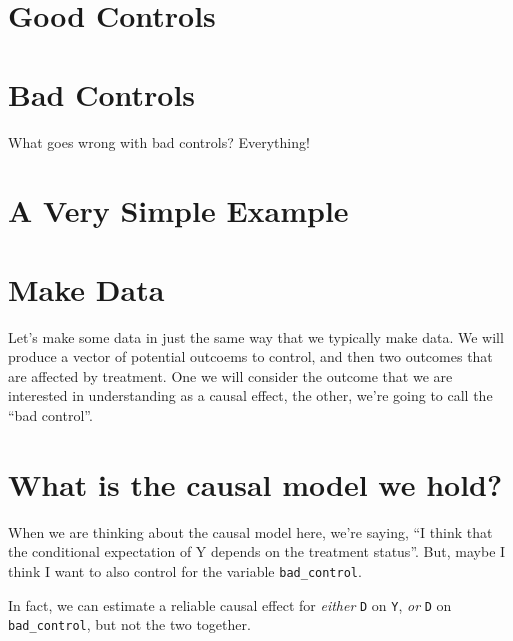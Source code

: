 \documentclass[
]{book}
\begin{document}
\hypertarget{good-controls}{%
\section{Good Controls}\label{good-controls}}

\hypertarget{bad-controls}{%
\section{Bad Controls}\label{bad-controls}}

What goes wrong with bad controls? Everything!

\hypertarget{a-very-simple-example}{%
\section{A Very Simple Example}\label{a-very-simple-example}}

\hypertarget{make-data-1}{%
\section{Make Data}\label{make-data-1}}

Let's make some data in just the same way that we typically make data.
We will produce a vector of potential outcoems to control, and then two
outcomes that are affected by treatment. One we will consider the
outcome that we are interested in understanding as a causal effect, the
other, we're going to call the ``bad control''.

\hypertarget{what-is-the-causal-model-we-hold}{%
\section{What is the causal model we
hold?}\label{what-is-the-causal-model-we-hold}}

When we are thinking about the causal model here, we're saying, ``I
think that the conditional expectation of Y depends on the treatment
status''. But, maybe I think I want to also control for the variable
\texttt{bad\_control}.

In fact, we can estimate a reliable causal effect for \emph{either}
\texttt{D} on \texttt{Y}, \emph{or} \texttt{D} on \texttt{bad\_control},
but not the two together.
\end{document}
